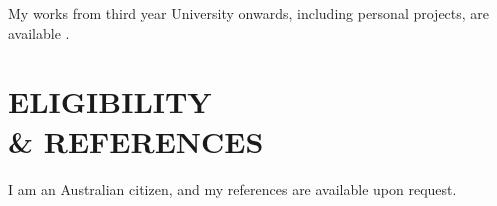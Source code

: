 \documentclass[margin, 11pt]{res} %
\begin{document}
\begin{resume}
My works from third year University onwards, including personal projects, are available \underline{}.





\section{ELIGIBILITY \\ \& REFERENCES} 

I am an Australian citizen, and my references are available upon request.

\end{resume}
\end{document}
